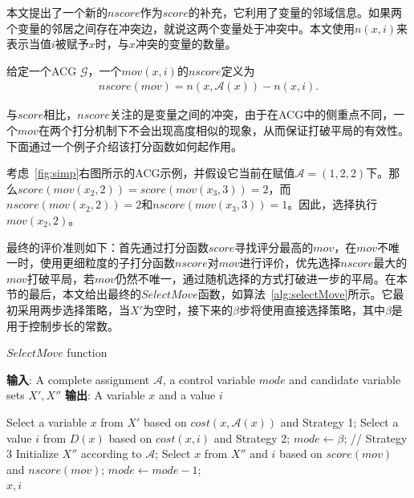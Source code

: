 本文提出了一个新的$nscore$作为$score$的补充，它利用了变量的邻域信息。如果两个变量的邻居之间存在冲突边，就说这两个变量处于冲突中。本文使用$n(x, i)$来表示当值$i$被赋予$x$时，与$x$冲突的变量的数量。

\begin{definition}
给定一个ACG $\mathcal{G}$，一个$mov(x,i)$的$nscore$定义为 
\begin{align}
    nscore(mov) = n(x, \mathcal{A}(x))  - n(x, i).
\end{align}%
\end{definition}

与$score$相比，$nscore$关注的是变量之间的冲突，由于在ACG中的侧重点不同，一个$mov$在两个打分机制下不会出现高度相似的现象，从而保证打破平局的有效性。下面通过一个例子介绍该打分函数如何起作用。

\begin{example}\label{exp:nscore}
考虑\figurename~\ref{fig:simp}右图所示的ACG示例，并假设它当前在赋值$\mathcal{A} = (1, 2, 2)$下。那么$score(mov(x_2, 2)) = score(mov(x_3, 3)) = 2$，而$nscore(mov(x_2, 2)) = 2$和$nscore(mov(x_3, 3)) = 1$。因此，选择执行$mov(x_2, 2)$。
\end{example}

最终的评价准则如下：首先通过打分函数$score$寻找评分最高的$mov$，在$mov$不唯一时，使用更细粒度的子打分函数$nscore$对$mov$进行评价，优先选择$nscore$最大的$mov$打破平局，若$mov$仍然不唯一，通过随机选择的方式打破进一步的平局。在本节的最后，本文给出最终的$SelectMove$函数，如算法~\ref{alg:selectMove}所示。它最初采用两步选择策略，当$X'$为空时，接下来的$\beta$步将使用直接选择策略，其中$\beta$是用于控制步长的常数。

\begin{algorithm}[t]
    \caption{$SelectMove$ function}
    \label{alg:selectMove}
    \textbf{输入}: A complete assignment $\mathcal{A}$, a control variable $mode$ and candidate variable sets $X', X''$\newline
    \textbf{输出}: A variable $x$ and a value $i$
    \begin{algorithmic}[1] %
        \Statex \hrulefill
            \STATE Select a variable $x$ from $X'$ based on $cost(x, \mathcal{A}(x))$ and Strategy 1; 
            \STATE Select a value $i$ from $D(x)$ based on $cost(x, i)$ and Strategy 2;
                \STATE $mode \leftarrow \beta$; // Strategy 3
                \STATE Initialize $X''$ according to $\mathcal{A}$;
            \ENDIF
        \ELSE
            \STATE Select $x$ from $X''$ and $i$ based on $score(mov)$ and $nscore(mov)$;
            \STATE $mode \leftarrow mode - 1$;
        \ENDIF \\
        \RETURN $x, i$
    \end{algorithmic}
\end{algorithm}


